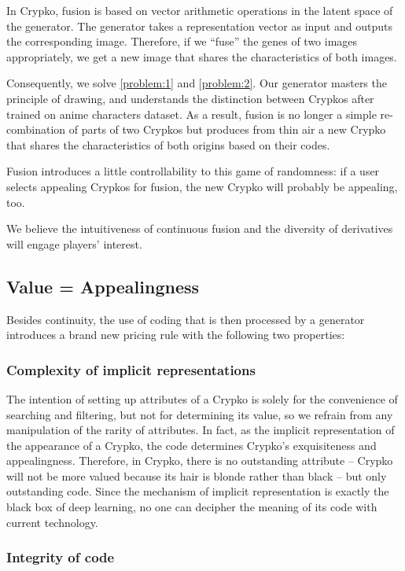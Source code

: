 \documentclass[a4paper]{article}
\begin{document}
In Crypko, fusion is based on vector arithmetic operations in the latent space of the generator\cite{radford2015unsupervised}. The generator takes a representation vector as input and outputs the corresponding image. Therefore, if we ``fuse'' the genes of two images appropriately, we get a new image that shares the characteristics of both images.

Consequently, we solve \ref{problem:1} and \ref{problem:2}. 
Our generator masters the principle of drawing, and understands the distinction between Crypkos after trained on anime characters dataset. 
As a result, fusion is no longer a simple re-combination of parts of two Crypkos but produces from thin air a new Crypko that shares the characteristics of both origins based on their codes.

Fusion introduces a little controllability to this game of randomness: if a user selects appealing Crypkos for fusion, the new Crypko will probably be appealing, too.

We believe the intuitiveness of continuous fusion and the diversity of derivatives will engage players' interest.

\subsection{Value = Appealingness}

Besides continuity, the use of coding that is then processed by a generator introduces a brand new pricing rule with the following two properties:

\subsubsection{Complexity of implicit representations}

The intention of setting up attributes of a Crypko is solely for the convenience of searching and filtering, but not for determining its value, so we refrain from any manipulation of the rarity of attributes. In fact, as the implicit representation of the appearance of a Crypko, the code determines Crypko's exquisiteness and appealingness. Therefore, in Crypko, there is no outstanding attribute -- Crypko will not be more valued because its hair is blonde rather than black -- but only outstanding code. Since the mechanism of implicit representation is exactly the black box of deep learning, no one can decipher the meaning of its code with current technology.

\subsubsection{Integrity of code}
\end{document}
